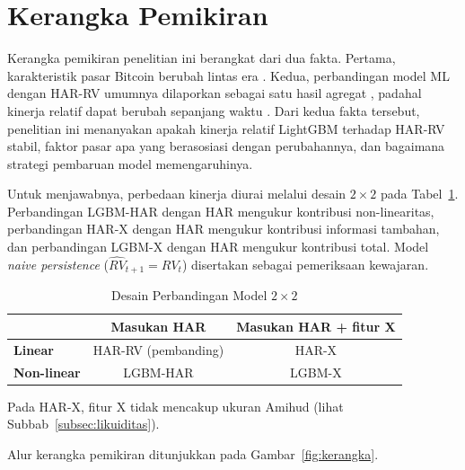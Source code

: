 \section{Kerangka Pemikiran}
Kerangka pemikiran penelitian ini berangkat dari dua fakta. Pertama,
karakteristik pasar Bitcoin berubah lintas era \cite{do2026,mokni2024}. Kedua,
perbandingan model ML dengan HAR-RV umumnya dilaporkan sebagai satu hasil
agregat \cite{dudek2024,huang2024}, padahal kinerja relatif dapat berubah
sepanjang waktu \cite{rossi2013,gama2014}. Dari kedua fakta tersebut,
penelitian ini menanyakan apakah kinerja relatif LightGBM terhadap HAR-RV
stabil, faktor pasar apa yang berasosiasi dengan perubahannya, dan bagaimana
strategi pembaruan model memengaruhinya.

Untuk menjawabnya, perbedaan kinerja diurai melalui desain $2 \times 2$ pada
Tabel~\ref{tab:desain}. Perbandingan LGBM-HAR dengan HAR mengukur kontribusi
non-linearitas, perbandingan HAR-X dengan HAR mengukur kontribusi informasi
tambahan, dan perbandingan LGBM-X dengan HAR mengukur kontribusi total. Model
\textit{naive persistence} ($\widehat{RV}_{t+1} = RV_t$) disertakan sebagai
pemeriksaan kewajaran.

\begin{table}[htbp]
  \caption{Desain Perbandingan Model $2 \times 2$}
  \label{tab:desain}
  \centering
  \begingroup
  \begin{tabular}{|l|c|c|}
    \hline
    & \textbf{Masukan HAR} & \textbf{Masukan HAR + fitur X} \\
    \hline
    \textbf{Linear} & HAR-RV (pembanding) & HAR-X \\
    \hline
    \textbf{Non-linear} & LGBM-HAR & LGBM-X \\
    \hline
  \end{tabular}
  \endgroup
\end{table}

Pada HAR-X, fitur X tidak mencakup ukuran Amihud (lihat
Subbab~\ref{subsec:likuiditas}).

Alur kerangka pemikiran ditunjukkan pada Gambar~\ref{fig:kerangka}.

